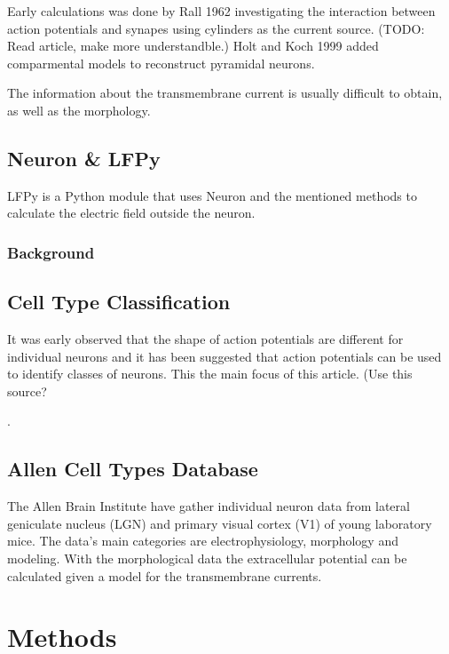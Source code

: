 \documentclass[altfont, fleqn]{uiophd}
\begin{document}
Early calculations was done by Rall 1962 investigating 
the interaction between action potentials and synapes using cylinders
as the current source. (TODO: Read article, make more understandble.)
Holt and Koch 1999 added comparmental models to reconstruct pyramidal neurons. 

The information about the transmembrane current is usually difficult to obtain,
as well as the morphology.


\section{Neuron \& LFPy }
LFPy is a Python module that uses Neuron and the mentioned methods to calculate the 
electric field outside the neuron. 
\cite{linden_lfpy:_2013}
\subsection*{Background}

\section{Cell Type Classification}

It was early observed that the shape of action potentials are different for 
individual neurons and it has been suggested that action potentials
can be used to identify classes of neurons. This the main focus of this article. 
(Use this source?

\cite{mountcastle_cortical_1969}.

\section{Allen Cell Types Database}
The Allen Brain Institute have gather individual neuron data from lateral geniculate
nucleus (LGN) and primary visual cortex (V1) of young laboratory mice. 
The data's main categories are electrophysiology, morphology and modeling.
With the morphological data the extracellular potential can be calculated given
a model for the transmembrane currents. 
\chapter{Methods}
\vspace{1em} 
\startcontents
{}
\end{document}
